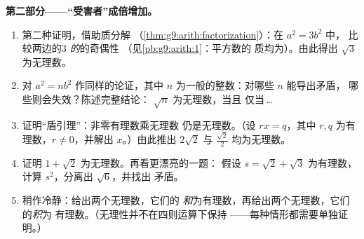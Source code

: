 \begin{problem}
\medskip
\noindent\textbf{第二部分——“受害者”成倍增加。}
\begin{enumerate}[resume]
  \item 第二种证明，借助质分解
        （\cref{thm:g9:arith:factorization}）：在 $a^2 = 3b^2$ 中，
        比较两边的\emph{$3$ 的}的奇偶性
        （见\cref{pb:g9:arith:1}：平方数的
        质均为）。由此得出 $\sqrt3$ 为无理数。
  \item 对 $a^2 = n b^2$ 作同样的论证，其中
        $n$ 为一般的整数：对哪些 $n$ 能导出矛盾，
        哪些则会失效？陈述完整结论：
        $\sqrt n$ 为无理数，当且
        仅当\,\dots
  \item 证明“盾引理”：非零有理数乘无理数
        仍是无理数。（设 $r x = q$，其中 $r, q$
        为有理数，$r \neq 0$，并解出 $x$。）由此推出
        $2\sqrt2$ 与 $\frac{\sqrt2}{2}$ 均为无理数。
  \item 证明 $1 + \sqrt2$ 为无理数。再看更漂亮的一题：
        假设 $s = \sqrt2 + \sqrt3$ 为有理数，
        计算 $s^2$，分离出 $\sqrt6$，并找出
        矛盾。
  \item 稍作冷静：给出两个无理数，它们的
        \emph{和}为有理数，再给出两个无理数，它们的\emph{积}为
        有理数。（无理性并不在四则运算下保持
——每种情形都需要单独证明。）
\end{enumerate}


\end{problem}
